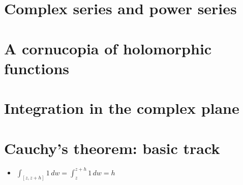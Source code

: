 \documentclass[11pt]{article}
\begin{document}
\section{Complex series and power series}

\section{A cornucopia of holomorphic functions}

\setcounter{section}{9}
\section{Integration in the complex plane}

\section{Cauchy's theorem: basic track}
\begin{itemize}
    \item $\int_{[z,z+h]}1\,dw=\int_{z}^{z+h}1\,dw=h$ 
\end{itemize}
\end{document}
